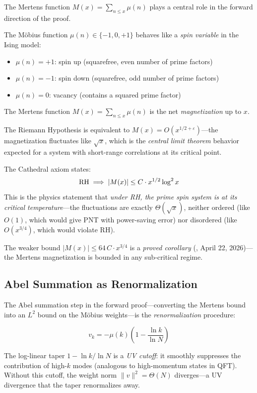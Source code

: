 \documentclass[11pt,a4paper]{article}
\begin{document}
The Mertens function $M(x) = \sum_{n \leq x} \mu(n)$ plays a central
role in the forward direction of the proof.

\begin{correspondence}
The M\"obius function $\mu(n) \in \{-1, 0, +1\}$ behaves like a
\emph{spin variable} in the Ising model:
\begin{itemize}
  \item $\mu(n) = +1$: spin up (squarefree, even number of prime factors)
  \item $\mu(n) = -1$: spin down (squarefree, odd number of prime factors)
  \item $\mu(n) = 0$: vacancy (contains a squared prime factor)
\end{itemize}
The Mertens function $M(x) = \sum_{n \leq x} \mu(n)$ is the net
\emph{magnetization} up to $x$.

The Riemann Hypothesis is equivalent to $M(x) = O(x^{1/2+\varepsilon})$---the
magnetization fluctuates like $\sqrt{x}$, which is the \emph{central limit
theorem} behavior expected for a system with short-range correlations at
its critical point.
\end{correspondence}

The Cathedral axiom  states:
\[
  \mathrm{RH} \implies |M(x)| \leq C \cdot x^{1/2} \log^2 x
\]
This is the physics statement that \emph{under RH, the prime spin system
is at its critical temperature}---the fluctuations are exactly
$\Theta(\sqrt{x})$, neither ordered (like $O(1)$, which would give PNT
with power-saving error) nor disordered (like $O(x^{3/4})$, which would
violate RH).

The weaker bound $|M(x)| \leq 64\, C \cdot x^{3/4}$ is a \emph{proved
corollary} (, April 22, 2026)---the Mertens
magnetization is bounded in any sub-critical regime.

\subsection{Abel Summation as Renormalization}

The Abel summation step in the forward proof---converting the Mertens
bound into an $L^2$ bound on the M\"obius weights---is the
\emph{renormalization} procedure:

\[
  v_k = -\mu(k)\left(1 - \frac{\ln k}{\ln N}\right)
\]

The log-linear taper $1 - \ln k / \ln N$ is a \emph{UV cutoff}: it
smoothly suppresses the contribution of high-$k$ modes (analogous to
high-momentum states in QFT). Without this cutoff, the weight norm
$\|v\|^2 = \Theta(N)$ diverges---a UV divergence that the taper
renormalizes away.
\end{document}
